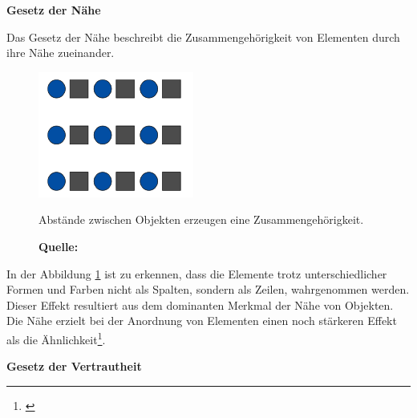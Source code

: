 \textbf{Gesetz der Nähe}

Das Gesetz der Nähe beschreibt die Zusammengehörigkeit von Elementen durch ihre Nähe zueinander.
\begin{figure}[H]
  \centering
  \includegraphics[scale=0.9]{img/gesetz_der_Naehe.PNG}
  \caption{Abstände zwischen Objekten erzeugen eine Zusammengehörigkeit.}
    \caption*{\textbf{Quelle:}\cite[60]{Dahm2006}}
  \label{fig:naehe}
\end{figure}
In der Abbildung \ref{fig:naehe} ist zu erkennen, dass die Elemente trotz unterschiedlicher Formen und Farben  nicht als Spalten, sondern als Zeilen, wahrgenommen werden. Dieser Effekt resultiert aus dem dominanten Merkmal der Nähe von Objekten. Die Nähe erzielt bei der Anordnung von Elementen einen noch stärkeren Effekt als die Ähnlichkeit\footnote{\cite[vgl.][60]{Dahm2006}}.


\textbf{Gesetz der Vertrautheit}

